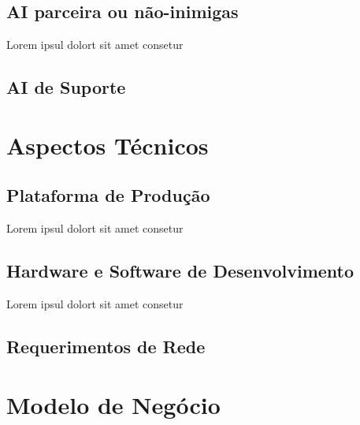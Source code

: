 \section{AI parceira ou não-inimigas}

Lorem ipsul dolort sit amet consetur

\section{AI de Suporte}

\chapter{Aspectos Técnicos}

\section{Plataforma de Produção}

\cite{shoemaker}
\cite{encyclopedia}
Lorem ipsul dolort sit amet consetur

\section{Hardware e Software de Desenvolvimento}

Lorem ipsul dolort sit amet consetur

\section{Requerimentos de Rede}

\chapter{Modelo de Negócio} 

